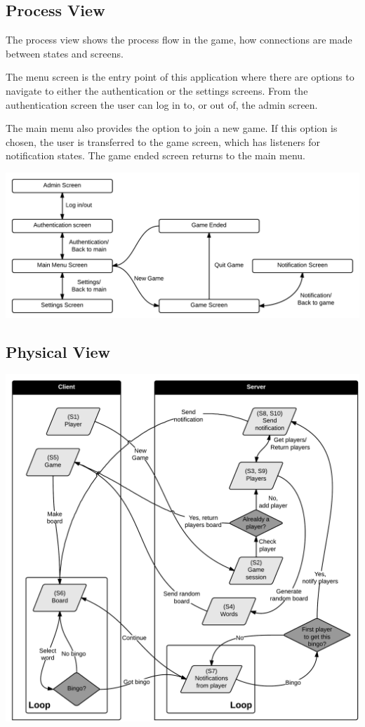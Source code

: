\subsection{Process View}
The process view shows the process flow in the game, how connections are made
between states and screens.

The menu screen is the entry point of this application where there are options
to navigate to either the authentication or the settings screens. From the
authentication screen the user can log in to, or out of, the admin screen.

The main menu also provides the option to join a new game. If this option is
chosen, the user is transferred to the game screen, which has listeners for
notification states. The game ended screen returns to the main menu.
\begin{center}
\includegraphics[clip=true, width=0.9 \textwidth]{assets/ProcessView.png}
\label{ref:gantt}
\end{center}

\subsection{Physical View}
\begin{center}
\includegraphics[scale=0.5]{PhysicalViewFinal}
\end{center}

